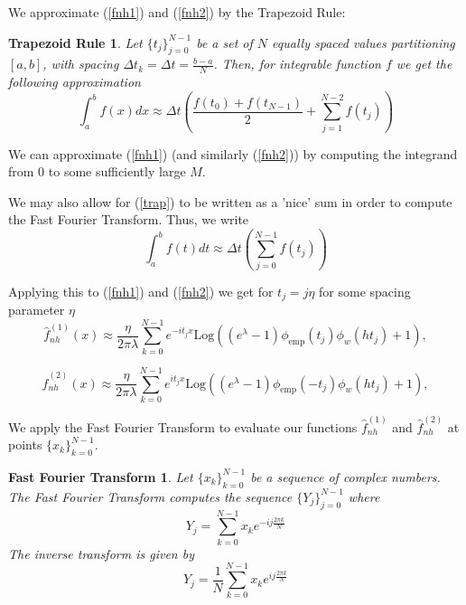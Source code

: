 \documentclass[a4paper,11pt]{article}
\theoremstyle{theorem}
\newtheorem*{trapezoid}{Trapezoid Rule}
\newtheorem*{fft}{Fast Fourier Transform}
\theoremstyle{definition}
\begin{document}
We approximate (\ref{fnh1}) and (\ref{fnh2}) by the Trapezoid Rule:
 
\begin{trapezoid}
Let $\{t_{j}\}_{j=0}^{N-1}$ be a set of $N$ equally spaced values partitioning $[a,b]$, with spacing $\Delta t_{k} = \Delta t = \frac{b-a}{N}$. Then, for integrable function $f$ we get the following approximation
\begin{equation} \label{trap}
\int_{a}^{b}{f(x)dx} \approx \Delta t\left( \frac{f(t_{0}) + f(t_{N-1})}{2} + \sum_{j=1}^{N-2}{f(t_{j})}\right)
\end{equation} 
\end{trapezoid}

We can approximate (\ref{fnh1}) (and similarly (\ref{fnh2})) by computing the integrand from $0$ to some sufficiently large $M$.

We may also allow for (\ref{trap}) to be written as a 'nice' sum in order to compute the Fast Fourier Transform. Thus, we write
\begin{equation}
\int_{a}^{b}{f(t)dt} \approx \Delta t\left(\sum_{j=0}^{N-1}{f(t_{j})}\right)
\end{equation} 

Applying this to (\ref{fnh1}) and (\ref{fnh2}) we get for $t_{j} = j\eta$ for some spacing parameter $\eta$
\begin{equation}
\hat{f}_{nh}^{(1)}(x) \approx \frac{\eta}{2\pi\lambda}\sum_{k=0}^{N-1}{e^{-it_{j}x}\text{Log}\left((e^{\lambda} - 1)\phi_{\text{emp}}(t_{j})\phi_{w}(ht_{j}) + 1\right)},
\end{equation}

\begin{equation}
\hat{f}_{nh}^{(2)}(x) \approx \frac{\eta}{2\pi\lambda}\sum_{k=0}^{N-1}{e^{it_{j}x}\text{Log}\left((e^{\lambda} - 1)\phi_{\text{emp}}(-t_{j})\phi_{w}(ht_{j}) + 1\right)},
\end{equation}

We apply the Fast Fourier Transform to evaluate our functions $\hat{f}_{nh}^{(1)}$ and $\hat{f}_{nh}^{(2)}$ at points $\{x_{k}\}_{k=0}^{N-1}$.

\begin{fft}
Let $\{x_{k}\}_{k=0}^{N-1}$ be a sequence of complex numbers. The Fast Fourier Transform computes the sequence $\{Y_{j}\}_{j=0}^{N-1}$ where
\begin{equation}
Y_{j} = \sum_{k=0}^{N-1}{x_{k}e^{-ij\frac{2\pi k}{N}}}
\end{equation}
The inverse transform is given by
\begin{equation}
Y_{j} = \frac{1}{N}\sum_{k=0}^{N-1}{x_{k}e^{ij\frac{2\pi k}{N}}}
\end{equation}
\end{fft}
\end{document}
